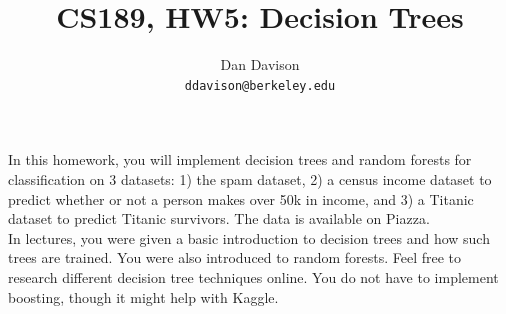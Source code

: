 \documentclass{article}
\title{CS189, HW5: Decision Trees}
\author{Dan Davison\\\texttt{ddavison@berkeley.edu}}
\date{}
\begin{document}
\maketitle

\noindent In this homework, you will implement decision trees and random forests for classification on 3 datasets: 1) the spam dataset, 2) a census income dataset to predict whether or not a person makes over 50k in income, and 3) a Titanic dataset to predict Titanic survivors. The data is available on Piazza. \\

\noindent In lectures, you were given a basic introduction to decision trees and how such trees are trained. You were also introduced to random forests. Feel free to research different decision tree techniques online. You do not have to implement boosting, though it might help with Kaggle.
\end{document}
